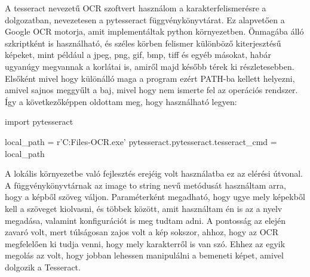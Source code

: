 A tesseract nevezetű OCR szoftvert használom a karakterfelismerésre a dolgozatban, nevezetesen a pytesseract függvénykönyvtárat. Ez alapvetően a Google OCR motorja, amit implementáltak python környezetben. Önmagába álló szkriptként is használható, és széles körben felismer különböző kiterjesztésű képeket, mint például a jpeg, png, gif, bmp, tiff és egyéb másokat, habár ugyanúgy megvannak a korlátai is, amiről majd később térek ki részletesebben. Elsőként mivel hogy különálló maga a program ezért PATH-ba kellett helyezni, amivel sajnos meggyűlt a baj, mivel hogy nem ismerte fel az operációs rendszer. Így a következőképpen oldottam meg, hogy használható legyen:
\begin{python}
	import pytesseract
	
	local_path =  r'C:\Program Files\Tesseract-OCR\tesseract.exe'
	pytesseract.pytesseract.tesseract_cmd = local_path
\end{python}
A lokális környezetbe való fejlesztés erejéig volt használatba ez az elérési útvonal. A függvénykönyvtárnak az image to string nevű metódusát használtam arra, hogy a képből szöveg váljon. Paraméterként megadható, hogy ugye mely képekből kell a szöveget kiolvasni, és többek között, amit használtam én is az a nyelv megadása, valamint konfigurációt is meg tudtam adni. A pontosság az elején zavaró volt, mert túlságosan zajos volt a kép sokszor, ahhoz, hogy az OCR megfelelően ki tudja venni, hogy mely karakterről is van szó. Ehhez az egyik megolás az volt, hogy jobban lehessen manipulálni a bemeneti képet, amivel dolgozik a Tesseract.